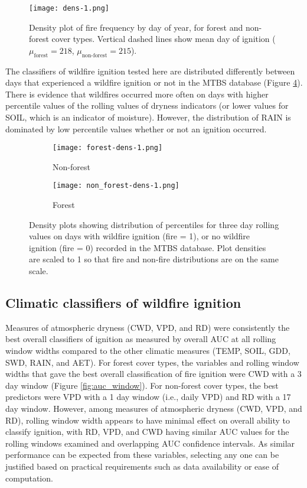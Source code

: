 \documentclass[11p]{article}
\begin{document}
\begin{figure}[htbp]
  \texttt{[image: dens-1.png]}
  \caption{Density plot of fire frequency by day of year, for forest and non-forest cover types. Vertical dashed lines show mean day of ignition ($\mu_{\text{forest}} = 218$, $\mu_{\text{non-forest}} = 215$).}
  \label{fig:fire-dens}
\end{figure}

The classifiers of wildfire ignition tested here are distributed differently between days that experienced a wildfire ignition or not in the MTBS database (Figure \ref{fig:dens}). There is evidence that wildfires occurred more often on days with higher percentile values of the rolling values of dryness indicators (or lower values for SOIL, which is an indicator of moisture). However, the distribution of RAIN is dominated by low percentile values whether or not an ignition occurred.  

\begin{figure}[htbp]
  \centering
  \begin{subfigure}{.5\textwidth}
    \centering
    \texttt{[image: forest-dens-1.png]}
    \caption{Non-forest}
    \label{fig:dens-nf}
  \end{subfigure}%
  \begin{subfigure}{.5\textwidth}
    \centering
    \texttt{[image: non\_forest-dens-1.png]}
    \caption{Forest}
    \label{fig:dens-f}
  \end{subfigure}
  \caption{Density plots showing distribution of percentiles for three day rolling values on days with wildfire ignition (fire = 1), or no wildfire ignition (fire = 0) recorded in the MTBS database. Plot densities are scaled to 1 so that fire and non-fire distributions are on the same scale.}
  \label{fig:dens}
\end{figure}

\subsection{Climatic classifiers of wildfire ignition}

Measures of atmospheric dryness (CWD, VPD, and RD) were consistently the best overall classifiers of ignition as measured by overall AUC at all rolling window widths compared to the other climatic measures (TEMP, SOIL, GDD, SWD, RAIN, and AET). For forest cover types, the variables and rolling window widths that gave the best overall classification of fire ignition were CWD with a 3 day window (Figure \ref{fig:auc_window}). For non-forest cover types, the best predictors were VPD with a 1 day window (i.e., daily VPD) and RD with a 17 day window. However, among measures of atmospheric dryness (CWD, VPD, and RD), rolling window width appears to have minimal effect on overall ability to classify ignition, with RD, VPD, and CWD having similar AUC values for the rolling windows examined and overlapping AUC confidence intervals. As similar performance can be expected from these variables, selecting any one can be justified based on practical requirements such as data availability or ease of computation.
\end{document}
